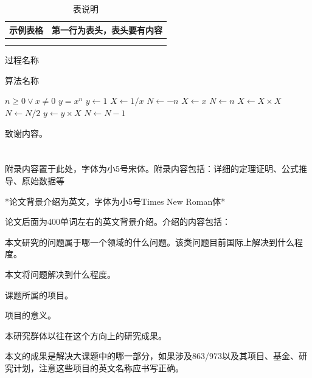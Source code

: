 \documentclass{cjc}
\begin{document}
\begin{table}[htb]
  \centering
  \caption{表说明}
  \small
  \begin{tabular}{cc}
    \toprule
    示例表格 & 第一行为表头，表头要有内容 \\
    \midrule
    & \\
    \midrule
    & \\
    \bottomrule
  \end{tabular}
\end{table}

\begin{procedure}
  \caption{过程名称}
  \small
  \begin{algorithmic}
    \REQUIRE
    \ENSURE
    \STATE {}
  \end{algorithmic}
\end{procedure}

\begin{algorithm}
  \caption{算法名称}
  \small
  \begin{algorithmic}
    \REQUIRE $n \geq 0 \vee x \neq 0$
    \ENSURE $y = x^n$
    \STATE $y \leftarrow 1$
      \STATE $X \leftarrow 1 / x$
      \STATE $N \leftarrow -n$
    \ELSE
      \STATE $X \leftarrow x$
      \STATE $N \leftarrow n$
    \ENDIF
        \STATE $X \leftarrow X \times X$
        \STATE $N \leftarrow N / 2$
      \ELSE[$N$ is odd]
        \STATE $y \leftarrow y \times X$
        \STATE $N \leftarrow N - 1$
      \ENDIF
    \ENDWHILE
  \end{algorithmic}
\end{algorithm}



\begin{acknowledgments}
  致谢内容。
\end{acknowledgments}


\nocite{*}





\newpage

\appendix

\section{}

附录内容置于此处，字体为小5号宋体。附录内容包括：详细的定理证明、公式推导、原始数据等


\makebiographies


\begin{background}
*论文背景介绍为英文，字体为小5号Times New Roman体*

论文后面为400单词左右的英文背景介绍。介绍的内容包括：

本文研究的问题属于哪一个领域的什么问题。该类问题目前国际上解决到什么程度。

本文将问题解决到什么程度。

课题所属的项目。

项目的意义。

本研究群体以往在这个方向上的研究成果。

本文的成果是解决大课题中的哪一部分，如果涉及863/973以及其项目、基金、研究计划，注意这些项目的英文名称应书写正确。
\end{background}
\end{document}
